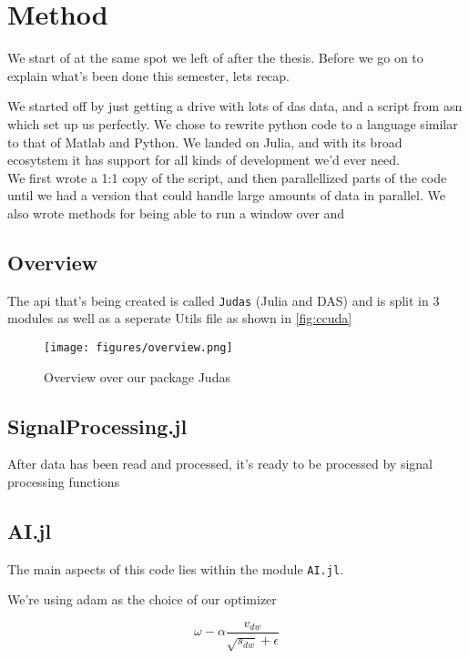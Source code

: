 \chapter{Method}
\label{chap:method}

We start of at the same spot we left of after the thesis. Before we go on to explain what's been done this semester, lets recap. 

We started off by just getting a drive with lots of \acrshort{das} data, and a script from \acrfull{asn} which set up us perfectly. We chose to rewrite python code to a language similar to that of Matlab and Python. We landed on Julia, and with its broad ecosytstem it has support for all kinds of development we'd ever need. \\

We first wrote a 1:1 copy of the script, and then parallellized parts of the code until we had a version that could handle large amounts of data in parallel. We also wrote methods for being able to run a window over and \\ 




\section{Overview}

The \acrshort{api} that's being created is called \texttt{Judas} (Julia and DAS) and is split in 3 modules as well as a seperate Utils file as shown in \ref{fig:ccuda}

\begin{figure}[h]
    \centering
    \texttt{[image: figures/overview.png]}
    \caption{Overview over our package Judas}
    \label{fig:judasoverview}
\end{figure}







\section{SignalProcessing.jl}

After data has been read and processed, it's ready to be processed by signal processing functions 

\section{AI.jl}

The main aspects of this code lies within the module \texttt{AI.jl}. 






We're using \acrfull{adam} as the choice of our optimizer

\begin{equation}
    \omega - \alpha \frac{v_{dw}}  {\sqrt{s_{dw}} + \epsilon}
\end{equation}